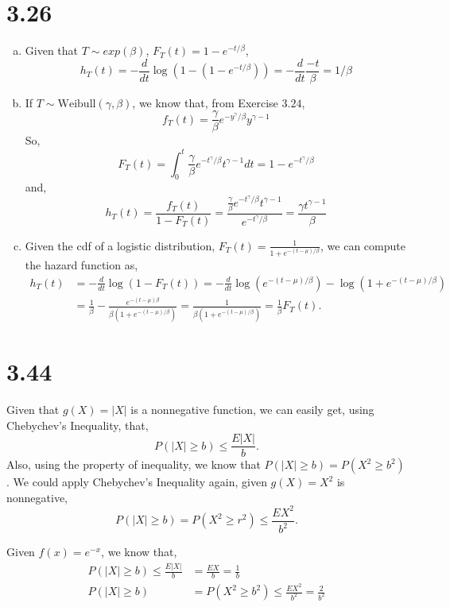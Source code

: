 \documentclass[letter]{article}
\begin{document}
    \section*{3.26}
    \begin{enumerate}[(a)]
    \item Given that $T \sim exp(\beta)$, $F_T(t) = 1 - e^{-t/\beta}$, 
    \[
    h_T(t) = -\frac{d}{dt}\log(1-(1-e^{-t/\beta})) = -\frac{d}{dt}\frac{-t}{\beta} = 1/\beta
    \]
    \item If $T \sim \text{Weibull}(\gamma, \beta)$, we know that, from Exercise $3.24$, 
    \[
    f_T(t) = \frac{\gamma}{\beta} e^{-y^\gamma/\beta} y^{\gamma-1}
    \]
    So,
    \[
    F_T(t) = \int_0^t \frac{\gamma}{\beta} e^{-t^\gamma/\beta} t^{\gamma -1} dt = 1-e^{-t^\gamma/\beta}
    \]
    and,
    \[
    h_T(t) = \frac{f_T(t)}{1-F_T(t)} = \frac{\frac{\gamma}{\beta} e^{-t^\gamma/\beta} t^{\gamma-1}}{e^{-t^\gamma/\beta}} = \frac{\gamma t^{\gamma-1}}{\beta}
    \]
    \item Given the cdf of a logistic distribution, $F_T(t) = \frac{1}{1+e^{-(t-\mu)/\beta}}$, we can compute the hazard function as,
    \begin{align*}
    h_T(t) & = -\frac{d}{dt} \log(1-F_T(t)) = -\frac{d}{dt} \log(e^{-(t-\mu)/\beta}) - \log(1+e^{-(t-\mu)/\beta}) \\
    & = \frac{1}{\beta} - \frac{e^{-(t-\mu)\beta}}{\beta(1+e^{-(t-\mu)/\beta})} = \frac{1}{\beta(1+e^{-(t-\mu)/\beta})} = \frac{1}{\beta} F_T(t).
    \end{align*}
    \end{enumerate}

    \section*{3.44}
    Given that $g(X) = |X|$ is a nonnegative function, we can easily get, using Chebychev's Inequality, that,
    \[
    P(|X| \ge b) \le \frac{E|X|}{b}.
    \]
    Also, using the property of inequality, we know that $P(|X| \ge b) = P(X^2 \ge b^2)$. We could apply Chebychev's Inequality again, given $g(X) = X^2$ is nonnegative,
    \[
    P(|X| \ge b) = P(X^2 \ge r^2) \le \frac{EX^2}{b^2}.
    \]
    
   Given $f(x) = e^{-x}$, we know that,
   \begin{align*}
   P(|X| \ge b) \le \frac{E|X|}{b} & = \frac{EX}{b} = \frac{1}{b} \\
   P(|X| \ge b) & = P(X^2 \ge b^2) \le \frac{EX^2}{b^2} = \frac{2}{b^2}
   \end{align*}
\end{document}
